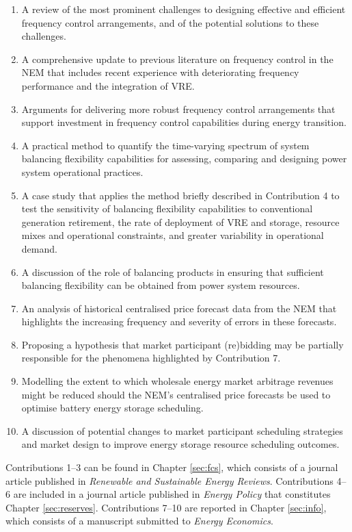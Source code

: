 \documentclass[12pt,a4paper,]{report}
\providecommand{\tightlist}{%
  \setlength{\itemsep}{0pt}\setlength{\parskip}{0pt}}
\begin{document}
\begin{enumerate}
\def\labelenumi{\arabic{enumi}.}
\tightlist
\item
  A review of the most prominent challenges to designing effective and
  efficient frequency control arrangements, and of the potential
  solutions to these challenges.
\item
  A comprehensive update to previous literature on frequency control in
  the NEM that includes recent experience with deteriorating frequency
  performance and the integration of VRE.
\item
  Arguments for delivering more robust frequency control arrangements
  that support investment in frequency control capabilities during
  energy transition.
\item
  A practical method to quantify the time-varying spectrum of system
  balancing flexibility capabilities for assessing, comparing and
  designing power system operational practices.
\item
  A case study that applies the method briefly described in Contribution
  4 to test the sensitivity of balancing flexibility capabilities to
  conventional generation retirement, the rate of deployment of VRE and
  storage, resource mixes and operational constraints, and greater
  variability in operational demand.
\item
  A discussion of the role of balancing products in ensuring that
  sufficient balancing flexibility can be obtained from power system
  resources.
\item
  An analysis of historical centralised price forecast data from the NEM
  that highlights the increasing frequency and severity of errors in
  these forecasts.
\item
  Proposing a hypothesis that market participant (re)bidding may be
  partially responsible for the phenomena highlighted by Contribution 7.
\item
  Modelling the extent to which wholesale energy market arbitrage
  revenues might be reduced should the NEM's centralised price forecasts
  be used to optimise battery energy storage scheduling.
\item
  A discussion of potential changes to market participant scheduling
  strategies and market design to improve energy storage resource
  scheduling outcomes.
\end{enumerate}

Contributions 1--3 can be found in Chapter \ref{sec:fcs}, which consists
of a journal article published in \emph{Renewable and Sustainable Energy
Reviews}. Contributions 4--6 are included in a journal article published
in \emph{Energy Policy} that constitutes Chapter \ref{sec:reserves}.
Contributions 7--10 are reported in Chapter \ref{sec:info}, which
consists of a manuscript submitted to \emph{Energy Economics}.
\end{document}
